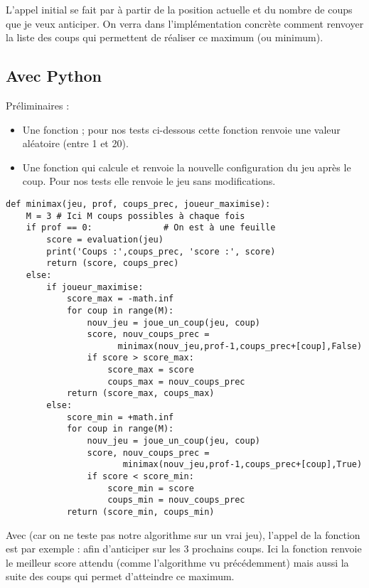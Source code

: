\documentclass[11pt,class=report,crop=false]{standalone}
\begin{document}
L'appel initial se fait par 
à partir de la position  actuelle et du nombre de coups  que je veux anticiper.
On verra dans l'implémentation concrète comment renvoyer la liste des coups qui permettent de réaliser ce maximum (ou minimum).


\subsection{Avec Python}

Préliminaires :
\begin{itemize}
	\item Une fonction  ; pour nos tests ci-dessous cette fonction renvoie une valeur aléatoire (entre 1 et 20).
	\item Une fonction  qui calcule et renvoie la nouvelle configuration du jeu après le coup. Pour nos tests elle renvoie le jeu sans modifications.
\end{itemize}

\begin{lstlisting}
def minimax(jeu, prof, coups_prec, joueur_maximise):
    M = 3 # Ici M coups possibles à chaque fois
	if prof == 0:              # On est à une feuille
		score = evaluation(jeu)
		print('Coups :',coups_prec, 'score :', score)
		return (score, coups_prec)
	else:
		if joueur_maximise:
			score_max = -math.inf
			for coup in range(M):
				nouv_jeu = joue_un_coup(jeu, coup)
				score, nouv_coups_prec = 
				      minimax(nouv_jeu,prof-1,coups_prec+[coup],False)
				if score > score_max:
					score_max = score
					coups_max = nouv_coups_prec
			return (score_max, coups_max)
		else:
			score_min = +math.inf
			for coup in range(M):
				nouv_jeu = joue_un_coup(jeu, coup)
				score, nouv_coups_prec = 
				       minimax(nouv_jeu,prof-1,coups_prec+[coup],True)
				if score < score_min:
					score_min = score
					coups_min = nouv_coups_prec
			return (score_min, coups_min)
\end{lstlisting}

Avec  (car on ne teste pas notre algorithme sur un vrai jeu), l'appel de la fonction est par exemple :  afin d'anticiper sur les 3 prochains coups.
Ici la fonction renvoie le meilleur score attendu (comme l'algorithme vu précédemment) mais aussi la suite des coups qui permet d'atteindre ce maximum.
\end{document}
